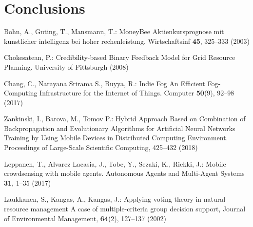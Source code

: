 \documentclass[runningheads]{llncs}
\begin{document}
\section{Conclusions}
%
%
%
% 
% 
%
\begin{thebibliography}{8}

 Bohn, A., Guting, T., Mansmann, T.: MoneyBee Aktienkursprognose mit kunstlicher intelligenz bei hoher rechenleistung. Wirtschaftsinf \textbf{45}, 325--333 (2003)

 Chokesatean, P.: Credibility-based Binary Feedback Model for Grid Resource Planning. University of Pittsburgh (2008)

 Chang, C., Narayana Srirama S., Buyya, R.: Indie Fog An Efficient Fog-Computing Infrastructure for the Internet of Things. Computer \textbf{50}(9), 92--98 (2017)

 Zankinski, I., Barova, M., Tomov P.: Hybrid Approach Based on Combination of Backpropagation and Evolutionary Algorithms for Artificial Neural Networks Training by Using Mobile Devices in Distributed Computing Environment. Proceedings of Large-Scale Scientific Computing, 425--432 (2018)

 Leppanen, T., Alvarez Lacasia, J., Tobe, Y., Sezaki, K., Riekki, J.: Mobile crowdsensing with mobile agents. Autonomous Agents and Multi-Agent Systems \textbf{31}, 1--35 (2017)

 Laukkanen, S., Kangas, A., Kangas, J.: Applying voting theory in natural resource management A case of multiple-criteria group decision support, Journal of Environmental Management, \textbf{64}(2), 127--137 (2002)

\end{thebibliography}
\end{document}
